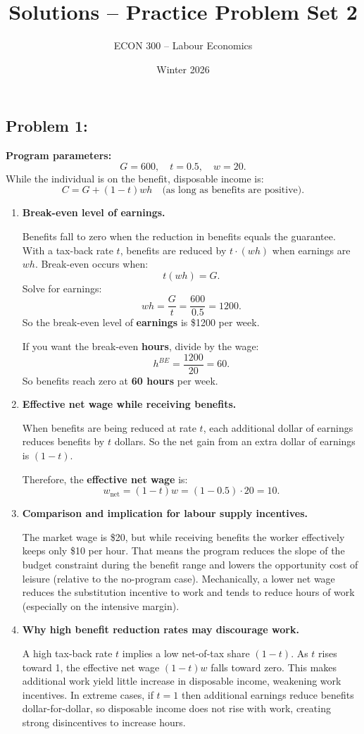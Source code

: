 \documentclass[12pt]{article}
\title{Solutions -- Practice Problem Set 2}
\author{ECON 300 -- Labour Economics}
\date{Winter 2026}
\begin{document}
\maketitle


\subsection*{Problem 1: }

\textbf{Program parameters:}
\[
G = 600,\quad t = 0.5,\quad w = 20.
\]
While the individual is on the benefit, disposable income is:
\[
C = G + (1-t)wh \quad \text{(as long as benefits are positive)}.
\]

\begin{enumerate}
\item \textbf{Break-even level of earnings.}

Benefits fall to zero when the reduction in benefits equals the guarantee. With a tax-back rate $t$, benefits are reduced by $t \cdot (wh)$ when earnings are $wh$.
Break-even occurs when:
\[
t(wh) = G.
\]
Solve for earnings:
\[
wh = \frac{G}{t} = \frac{600}{0.5} = 1200.
\]
So the break-even level of \textbf{earnings} is \$1200 per week.

If you want the break-even \textbf{hours}, divide by the wage:
\[
h^{BE} = \frac{1200}{20} = 60.
\]
So benefits reach zero at \textbf{60 hours} per week.

\item \textbf{Effective net wage while receiving benefits.}

When benefits are being reduced at rate $t$, each additional dollar of earnings reduces benefits by $t$ dollars.
So the net gain from an extra dollar of earnings is $(1-t)$.

Therefore, the \textbf{effective net wage} is:
\[
w_{\text{net}} = (1-t)w = (1-0.5)\cdot 20 = 10.
\]

\item \textbf{Comparison and implication for labour supply incentives.}

The market wage is \$20, but while receiving benefits the worker effectively keeps only \$10 per hour.
That means the program reduces the slope of the budget constraint during the benefit range and lowers the opportunity cost of leisure (relative to the no-program case).
Mechanically, a lower net wage reduces the substitution incentive to work and tends to reduce hours of work (especially on the intensive margin).

\item \textbf{Why high benefit reduction rates may discourage work.}

A high tax-back rate $t$ implies a low net-of-tax share $(1-t)$.
As $t$ rises toward 1, the effective net wage $(1-t)w$ falls toward zero.
This makes additional work yield little increase in disposable income, weakening work incentives.
In extreme cases, if $t=1$ then additional earnings reduce benefits dollar-for-dollar, so disposable income does not rise with work, creating strong disincentives to increase hours.
\end{enumerate}
\end{document}

